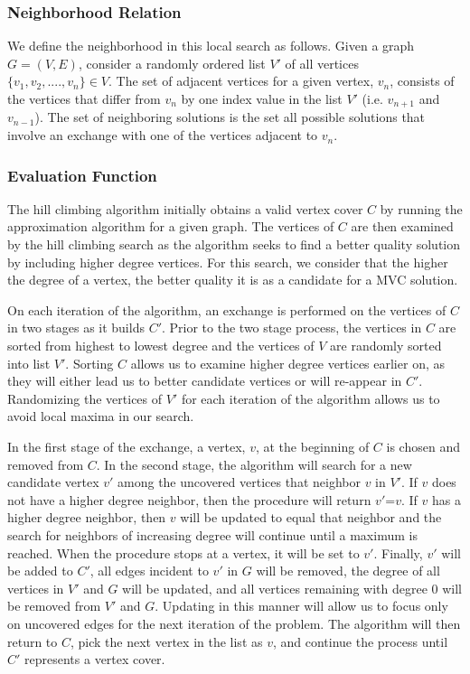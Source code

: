 \documentclass{sig-alternate-05-2015}
\begin{document}
\subsubsection{Neighborhood Relation}
We define the neighborhood in this local search as follows.  Given a graph $G=(V,E)$, consider a randomly ordered list $V'$ of all vertices $\lbrace v_{1},v_{2},....,v_{n} \rbrace \in V$.  The set of adjacent vertices for a given vertex, $v_{n}$, consists of the vertices that differ from $v_n$ by one index value in the list $V'$ (i.e. $v_{n+1}$ and $v_{n-1}$). The set of neighboring solutions is the set all possible solutions that involve an exchange with one of the vertices adjacent to $v_n$.
\par
\subsubsection{Evaluation Function}
The hill climbing algorithm initially obtains a valid vertex cover $C$ by running the approximation algorithm for a given graph. The vertices of $C$ are then examined by the hill climbing search as the algorithm seeks to find a better quality solution by including higher degree vertices. For this search, we consider that the higher the degree of a vertex, the better quality it is as a candidate for a MVC solution.
\par
On each iteration of the algorithm, an exchange is performed on the vertices of $C$ in two stages as it builds $C'$. Prior to the two stage process, the vertices in $C$ are sorted from highest to lowest degree and the vertices of $V$ are randomly sorted into list $V'$. Sorting $C$ allows us to examine higher degree vertices earlier on, as they will either lead us to better candidate vertices or will re-appear in $C'$.  Randomizing the vertices of $V'$ for each iteration of the algorithm allows us to avoid local maxima in our search.  
\par
In the first stage of the exchange, a vertex, $v$, at the beginning of $C$ is chosen and removed from $C$.  In the second stage, the algorithm will search for a new candidate vertex $v'$ among the uncovered vertices that neighbor $v$ in $V'$.  If $v$ does not have a higher degree neighbor, then the procedure will return $v'$=$v$.  If $v$ has a higher degree neighbor, then $v$ will be updated to equal that neighbor and the search for neighbors of increasing degree will continue until a maximum is reached. When the procedure stops at a vertex, it will be set to $v'$. Finally, $v'$ will be added to $C'$, all edges incident to $v'$ in $G$ will be removed, the degree of all vertices in $V'$ and $G$ will be updated, and all vertices remaining with degree 0 will be removed from $V'$ and $G$. Updating in this manner will allow us to focus only on uncovered edges for the next iteration of the problem. The algorithm will then return to $C$, pick the next vertex in the list as $v$, and continue the process until $C'$ represents a vertex cover.
\end{document}

